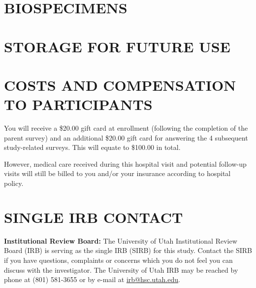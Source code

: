 \documentclass[11pt]{article}
\begin{document}
%
{%
\section{BIOSPECIMENS}
\label{sec:biospecimens}
{}
}%
{}%

%
{%
\section{STORAGE FOR FUTURE USE}
\label{sec:tissuebanking}
{}
}%
{}%

%
{%
\section{COSTS AND COMPENSATION TO PARTICIPANTS}
\label{sec:costsandcompensation}
{You will receive a \$20.00 gift card at enrollment (following the completion of the parent survey) and an additional \$20.00 gift card for answering the 4 subsequent study-related surveys. This will equate to \$100.00 in total. 

However, medical care received during this hospital visit and potential follow-up visits will still be billed to you and/or your insurance according to hospital policy.  }
}%
{}%



%
{%
\section{SINGLE IRB CONTACT}
\label{sec:singleirbcontact}
\textbf{Institutional Review Board:} The University
of Utah Institutional Review Board (IRB) is serving
as the single IRB (SIRB) for this study. Contact the SIRB
if you have questions, complaints or concerns which
you do not feel you can discuss with the investigator.
The University of Utah IRB may be reached by phone at
(801) 581-3655 or by e-mail at
\href{mailto:irb@hsc.utah.edu}{irb@hsc.utah.edu}.
}%
{%
{}
}
\end{document}
